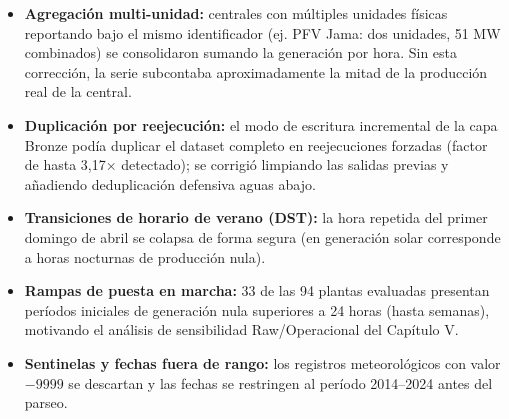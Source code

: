 \begin{itemize}
    \item \textbf{Agregación multi-unidad:} centrales con múltiples unidades físicas reportando bajo el mismo identificador (ej. PFV Jama: dos unidades, 51 MW combinados) se consolidaron sumando la generación por hora. Sin esta corrección, la serie subcontaba aproximadamente la mitad de la producción real de la central.
    \item \textbf{Duplicación por reejecución:} el modo de escritura incremental de la capa Bronze podía duplicar el dataset completo en reejecuciones forzadas (factor de hasta 3,17$\times$ detectado); se corrigió limpiando las salidas previas y añadiendo deduplicación defensiva aguas abajo.
    \item \textbf{Transiciones de horario de verano (DST):} la hora repetida del primer domingo de abril se colapsa de forma segura (en generación solar corresponde a horas nocturnas de producción nula).
    \item \textbf{Rampas de puesta en marcha:} 33 de las 94 plantas evaluadas presentan períodos iniciales de generación nula superiores a 24 horas (hasta semanas), motivando el análisis de sensibilidad Raw/Operacional del Capítulo V.
    \item \textbf{Sentinelas y fechas fuera de rango:} los registros meteorológicos con valor $-9999$ se descartan y las fechas se restringen al período 2014--2024 antes del parseo.
\end{itemize}
